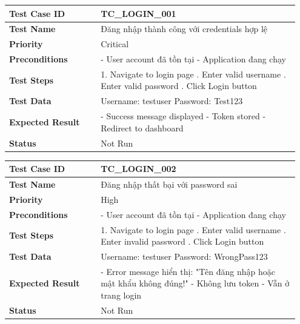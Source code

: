 \documentclass[a4paper,12pt]{article}
\begin{document}
\begin{longtable}{|p{0.3\linewidth}|p{0.65\linewidth}|}
\hline
\textbf{Test Case ID} & TC\_LOGIN\_001 \\ \hline
\textbf{Test Name} & Đăng nhập thành công với credentials hợp lệ \\ \hline
\textbf{Priority} & Critical \\ \hline
\textbf{Preconditions} & - User account đã tồn tại \newline - Application đang chạy \\ \hline
\textbf{Test Steps} & 1. Navigate to login page \newline 2. Enter valid username \newline 3. Enter valid password \newline 4. Click Login button \\ \hline
\textbf{Test Data} & Username: testuser \newline Password: Test123 \\ \hline
\textbf{Expected Result} & - Success message displayed \newline - Token stored \newline - Redirect to dashboard \\ \hline
\textbf{Status} & Not Run \\ \hline
\end{longtable}

\begin{longtable}{|p{0.3\linewidth}|p{0.65\linewidth}|}
\hline
\textbf{Test Case ID} & TC\_LOGIN\_002 \\ \hline
\textbf{Test Name} & Đăng nhập thất bại với password sai \\ \hline
\textbf{Priority} & High \\ \hline
\textbf{Preconditions} & - User account đã tồn tại \newline - Application đang chạy \\ \hline
\textbf{Test Steps} & 1. Navigate to login page \newline 2. Enter valid username \newline 3. Enter invalid password \newline 4. Click Login button \\ \hline
\textbf{Test Data} & Username: testuser \newline Password: WrongPass123 \\ \hline
\textbf{Expected Result} & - Error message hiển thị: "Tên đăng nhập hoặc mật khẩu không đúng!" \newline - Không lưu token \newline - Vẫn ở trang login \\ \hline
\textbf{Status} & Not Run \\ \hline
\end{longtable}
\end{document}
